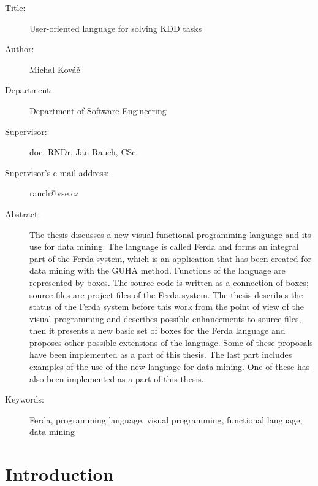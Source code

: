 \documentclass[a4paper,12pt]{book}
\begin{document}
{\begin{description}
 \item [Title:] User-oriented language for solving KDD tasks
 \item [Author:] Michal Kováč
 \item [Department:] Department of Software Engineering
 \item [Supervisor:] doc. RNDr. Jan Rauch, CSc.
 \item [Supervisor's e-mail address:] rauch@vse.cz
 \item [Abstract:] The thesis discusses a new visual functional programming language and its use for data mining. The language is called Ferda and forms an integral part of the Ferda system, which is an application that has been created for data mining with the GUHA method. Functions of the language are represented by boxes. The source code is written as a connection of boxes; source files are project files of the Ferda system. The thesis describes the status of the Ferda system before this work from the point of view of the visual programming and describes possible enhancements to source files, then it presents a new basic set of boxes for the Ferda language and proposes other possible extensions of the language. Some of these proposals have been implemented as a part of this thesis. The last part includes examples of the use of the new language for data mining. One of these has also been implemented as a part of this thesis.

 \item [Keywords:] Ferda, programming language, visual programming, functional language, data mining
\end{description}
}

\chapter{Introduction}
\end{document}
